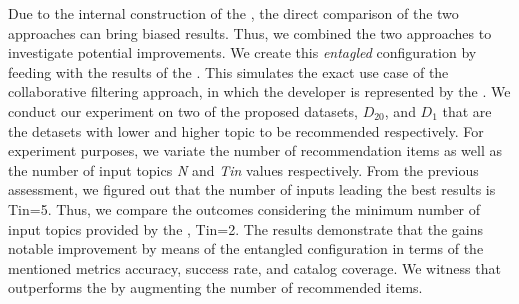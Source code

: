 Due to the internal construction of the \MNB, the direct comparison of the two approaches can bring biased results. Thus, we combined the two approaches to investigate potential improvements. We create this \emph{entagled} configuration by feeding \TF with the results of the \MNB. This simulates the exact use case of the collaborative filtering approach, in which the developer is represented by the \MNB. 
We conduct our experiment on two of the proposed datasets, \ie  $D_{20}$, and  $D_{1}$ that are the detasets with lower and higher topic to be recommended respectively.
For experiment purposes, we variate the number of recommendation items as well as the number of input topics \ie \emph{N} and \emph{Tin} values respectively. From the previous assessment, we figured out that the number of inputs leading the best results is Tin=5. Thus, we compare the outcomes considering the minimum number of input topics provided by the \MNB, \ie Tin=2. The results demonstrate that the \MNB gains notable improvement by means of the entangled configuration in terms of the mentioned metrics \ie accuracy, success rate, and catalog coverage. We witness that \TF outperforms the \MNB by augmenting the number of recommended items. 








